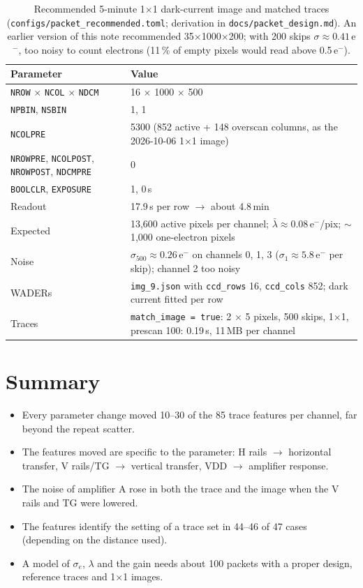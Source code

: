 \documentclass[10pt]{article}
\newcommand{\code}[1]{\texttt{#1}}
\begin{document}
\begin{table}[H]
\centering
\begin{tabular}{ll}
\toprule
Parameter & Value \\
\midrule
\code{NROW} $\times$ \code{NCOL} $\times$ \code{NDCM} & 16 $\times$ 1000 $\times$ 500 \\
\code{NPBIN}, \code{NSBIN} & 1, 1 \\
\code{NCOLPRE} & 5300 (852 active + 148 overscan columns, as the 2026-10-06 1$\times$1 image) \\
\code{NROWPRE}, \code{NCOLPOST}, \code{NROWPOST}, \code{NDCMPRE} & 0 \\
\code{BOOLCLR}, \code{EXPOSURE} & 1, 0\,s \\
Readout & 17.9\,s per row $\to$ about 4.8\,min \\
Expected & 13,600 active pixels per channel; $\bar\lambda \approx 0.08$\,e$^-$/pix; $\sim$1,000 one-electron pixels \\
Noise & $\sigma_{500} \approx 0.26$\,e$^-$ on channels 0, 1, 3 ($\sigma_1 \approx 5.8$\,e$^-$ per skip); channel 2 too noisy \\
WADERs & \code{img\_9.json} with \code{ccd\_rows} 16, \code{ccd\_cols} 852; dark current fitted per row \\
Traces & \code{match\_image = true}: 2 $\times$ 5 pixels, 500 skips, 1$\times$1, prescan 100: 0.19\,s, 11\,MB per channel \\
\bottomrule
\end{tabular}
\caption{Recommended 5-minute 1$\times$1 dark-current image and matched traces (\code{configs/packet\_recommended.toml};
derivation in \code{docs/packet\_design.md}). An earlier version of this note recommended 35$\times$1000$\times$200; with
200 skips $\sigma \approx 0.41$\,e$^-$, too noisy to count electrons (11\,\% of empty pixels would read above 0.5\,e$^-$).}
\label{tab:image}
\end{table}

\section{Summary}

\begin{itemize}
\item Every parameter change moved 10--30 of the 85 trace features per channel, far beyond the repeat scatter.
\item The features moved are specific to the parameter: H rails $\to$ horizontal transfer, V rails/TG $\to$ vertical
  transfer, VDD $\to$ amplifier response.
\item The noise of amplifier A rose in both the trace and the image when the V rails and TG were lowered.
\item The features identify the setting of a trace set in 44--46 of 47 cases (depending on the distance used).
\item A model of $\sigma_e$, $\lambda$ and the gain needs about 100 packets with a proper design, reference traces and 1$\times$1
  images.
\end{itemize}
\end{document}
